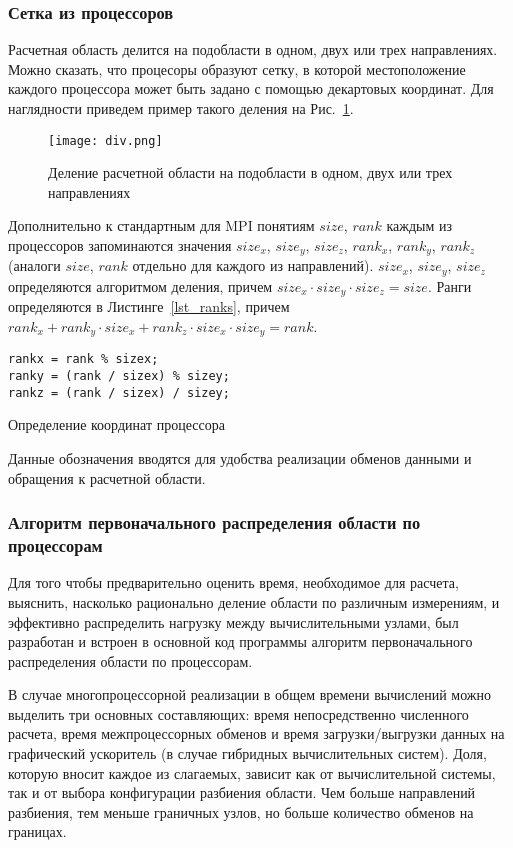 \subsubsection*{Сетка из процессоров}
Расчетная область делится на подобласти в одном, двух или трех направлениях.
Можно сказать, что процесоры образуют сетку, в которой
местоположение каждого процессора может быть задано с помощью
декартовых координат.
Для наглядности приведем пример такого деления на Рис.~\ref{pic_div}.
\begin{figure}[!h]\center
\texttt{[image: div.png]} 
\caption{Деление расчетной области на подобласти в одном, двух или трех направлениях}
\label{pic_div}
\end{figure}
Дополнительно к стандартным для MPI понятиям $size$, $rank$
каждым из процессоров запоминаются значения $size_x$, $size_y$, $size_z$,
$rank_x$, $rank_y$, $rank_z$ (аналоги $size$, $rank$ отдельно для каждого из направлений).
$size_x$, $size_y$, $size_z$ определяются алгоритмом деления,
причем $size_x \cdot size_y \cdot size_z = size$.
Ранги определяются в Листинге~\ref{lst_ranks}, причем
$rank_x + rank_y \cdot size_x + rank_z \cdot size_x \cdot size_y = rank$.
\begin{listing}
\begin{verbatim}
rankx = rank % sizex;
ranky = (rank / sizex) % sizey;
rankz = (rank / sizex) / sizey;
\end{verbatim}
\caption{Определение координат процессора}
\label{lst_ranks}
\end{listing}
Данные обозначения вводятся для удобства реализации обменов
данными и обращения к расчетной области.

\subsubsection*{Алгоритм первоначального распределения области по процессорам}

Для того чтобы предварительно оценить время, необходимое для расчета, выяснить, насколько 
рационально деление области по различным измерениям, и эффективно распределить нагрузку
между вычислительными узлами, был разработан и встроен в основной код программы
алгоритм первоначального распределения области по процессорам.

В случае многопроцессорной реализации в общем времени вычислений можно выделить
три основных составляющих: время непосредственно численного расчета, время
межпроцессорных обменов и время загрузки/выгрузки данных на графический ускоритель 
(в случае гибридных вычислительных систем). Доля, которую вносит каждое из
слагаемых, зависит как от вычислительной системы, так и от выбора конфигурации разбиения
области. Чем больше направлений разбиения, тем меньше граничных узлов, но
больше количество обменов на границах.


